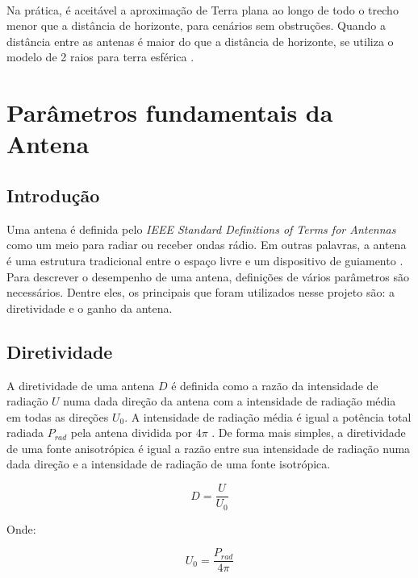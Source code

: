 \paragraph{}Na prática, é aceitável a aproximação de Terra plana ao longo de todo o trecho menor que a distância de horizonte, para cenários sem obstruções. Quando a distância entre as antenas é maior do que a distância de horizonte, se utiliza o modelo de 2 raios para terra esférica \citep{Andrezo}.



\section{Parâmetros fundamentais da Antena}

\subsection{Introdução}Uma antena é definida pelo \textit{IEEE Standard Definitions of Terms for Antennas} como um meio para radiar ou receber ondas rádio. Em outras palavras, a antena é uma estrutura tradicional entre o espaço livre e um dispositivo de guiamento \citep{balanis}. Para descrever o desempenho de uma antena, definições de vários parâmetros são necessários. Dentre eles, os principais que foram utilizados nesse projeto são: a diretividade e o ganho da antena.

\subsection{Diretividade}A diretividade de uma antena $D$ é definida como a razão da intensidade de radiação $U$ numa dada direção da antena com a intensidade de radiação média em todas as direções $U_0$. A intensidade de radiação média é igual a potência total radiada $P_{rad}$ pela antena dividida por 4$\pi$ \citep{balanis}. De forma mais simples, a diretividade  de uma fonte anisotrópica é igual a razão entre sua intensidade de radiação numa dada direção e a intensidade de radiação de uma fonte isotrópica.

\begin{equation}
    D = \frac{U}{U_0}
    \label{9}
\end{equation}

Onde:

\begin{equation}
    U_0 = \frac{P_{rad}}{4\pi}
    \label{10}
\end{equation}

